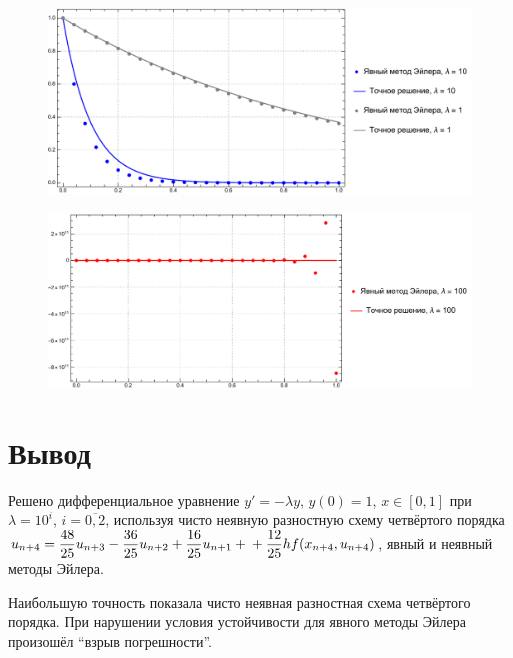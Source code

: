 \documentclass[
11pt,
master, %
subf, %
href, %
colorlinks=true, %
times, %
]{disser}
\begin{document}
\begin{figure}[h!]
  \centering
  \includegraphics[width=0.8\linewidth]{pl252}
  \caption{}\label{ris:9}
\end{figure}

\newpage
\begin{figure}[h!]
  \centering
  \includegraphics[width=0.8\linewidth]{pl2521}
  \caption{}\label{ris:10}
\end{figure}

\section{Вывод}
Решено дифференциальное уравнение $y' = -\lambda y$, $y(0) = 1$, $x \in [0,1]$ при $\lambda = 10^i$, $i = \overline{0,2}$, используя чисто неявную разностную схему четвёртого порядка $\displaystyle u_{n+4} = \frac{48}{25}u_{n+3} - \frac{36}{25}u_{n+2} + \frac{16}{25}u_{n+1}+\\ + \frac{12}{25}hf(x_{n+4},u_{n+4})$, явный и неявный методы Эйлера.

Наибольшую точность показала чисто неявная разностная схема четвёртого порядка. При нарушении условия устойчивости для явного методы Эйлера произошёл ``взрыв погрешности''.
\end{document}
